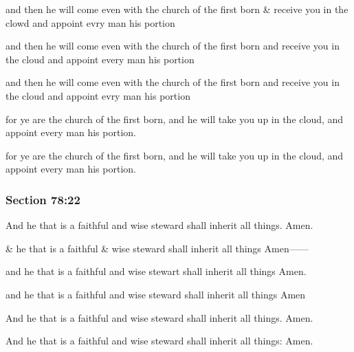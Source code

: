 		\begin{framed}
		\scriptsize
			\begin{compactdesc}
				\item[JSP] and then he will come even with the church of the first born \& receive you in the clowd and appoint evry man his portion
				\item[RB1] and then he will come even with the church of the first born and receive you in the cloud and appoint every man his portion
				\item[RB2] and then he will come even with the church of the first born and receive you in the cloud and appoint evry man his portion
				\item[DC 1835] for ye are the church of the first born, and he will take you up in the cloud, and appoint every man his portion.
				\item[DC 1844] for ye are the church of the first born, and he will take you up in the cloud, and appoint every man his portion.
			\end{compactdesc}
		\end{framed}

	\subsubsection{Section 78:22} %
		\label{DC78-22}

		And he that is a faithful and wise steward shall inherit all things.  Amen.

		\begin{framed}
		\scriptsize
			\begin{compactdesc}
				\item[JSP] \& he that is a faithful \& wise steward shall inherit all things Amen------
				\item[RB1] and he that is a faithful and wise stewart shall inherit all things Amen.
				\item[RB2] and he that is a faithful and wise steward shall inherit all things Amen
				\item[DC 1835] And he that is a faithful and wise steward shall inherit all things. Amen.
				\item[DC 1844] And he that is a faithful and wise steward shall inherit all things: Amen.
			\end{compactdesc}
		\end{framed}
